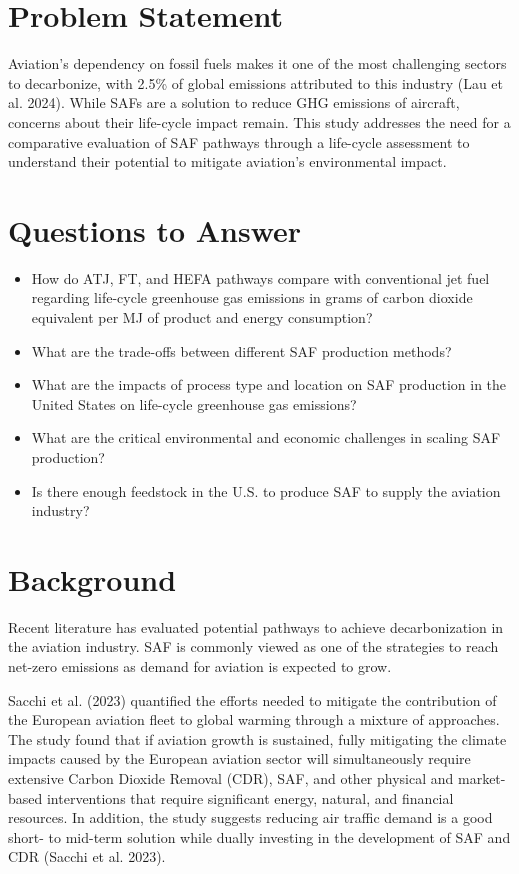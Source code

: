 \documentclass[12pt]{article}
\begin{document}
\section{Problem Statement}
Aviation’s dependency on fossil fuels makes it one of the most challenging sectors to decarbonize, with 2.5\% of global emissions attributed to this industry (Lau et al. 2024). While SAFs are a solution to reduce GHG emissions of aircraft, concerns about their life-cycle impact remain. This study addresses the need for a comparative evaluation of SAF pathways through a life-cycle assessment to understand their potential to mitigate aviation’s environmental impact.

\section{Questions to Answer}
\begin{itemize}
    \item How do ATJ, FT, and HEFA pathways compare with conventional jet fuel regarding life-cycle greenhouse gas emissions in grams of carbon dioxide equivalent per MJ of product and energy consumption?
    \item What are the trade-offs between different SAF production methods?
    \item What are the impacts of process type and location on SAF production in the United States on life-cycle greenhouse gas emissions?
    \item What are the critical environmental and economic challenges in scaling SAF production?
    \item Is there enough feedstock in the U.S. to produce SAF to supply the aviation industry?
\end{itemize}

\section{Background}

Recent literature has evaluated potential pathways to achieve decarbonization in the aviation industry. SAF is commonly viewed as one of the strategies to reach net-zero emissions as demand for aviation is expected to grow. 

Sacchi et al. (2023) quantified the efforts needed to mitigate the contribution of the European aviation fleet to global warming through a mixture of approaches. The study found that if aviation growth is sustained, fully mitigating the climate impacts caused by the European aviation sector will simultaneously require extensive Carbon Dioxide Removal (CDR), SAF, and other physical and market-based interventions that require significant energy, natural, and financial resources. In addition, the study suggests reducing air traffic demand is a good short- to mid-term solution while dually investing in the development of SAF and CDR (Sacchi et al. 2023).
\end{document}
